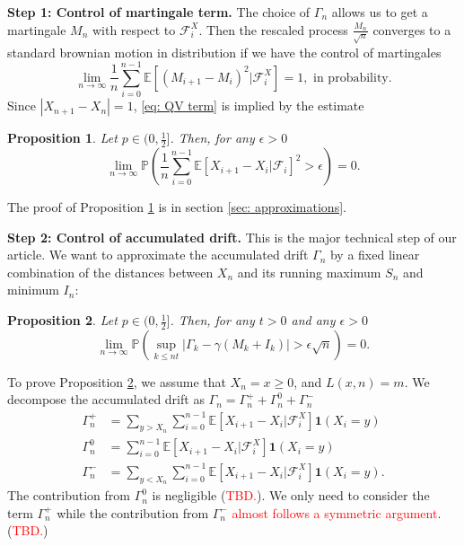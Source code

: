 \documentclass[twoside,12pt,a4paper]{article}
\newtheorem{proposition}{Proposition}[section]
\numberwithin{equation}{section}
\newcommand{\abs}[1]{\left\vert #1 \right\vert}
\newcommand\TBD{\textcolor{red}{TBD.}}
\begin{document}
	\textbf{Step 1: Control of martingale term.}
	The choice of $\Gamma_n$ allows us to get a martingale $M_n$ with respect to $\mathcal{F}_i^X.$ Then the rescaled process $\frac{M_n}{\sqrt{n}}$ converges to a standard brownian motion in distribution if we have the control of martingales 
	\begin{equation}\label{eq: QV term}
		\lim_{n\to \infty}\frac{1}{n} \sum_{i=0}^{n-1}\mathbb{E}\left[ (M_{i+1}- M_{i})^2 |\mathcal{F}_i^X \right] =1,  \mbox{ in probability}.
	\end{equation}
	Since $\abs{X_{n+1}-X_n}=1$,  \eqref{eq: QV term} is implied by the estimate
	\begin{proposition} \label{lm: control of martingale} Let $p\in (0,\frac{1}{2}]$. Then, for any $\epsilon >0$
		\begin{equation}\label{eq:  term}
			\lim_{n \to \infty }\mathbb{P}\left(\frac{1}{n} \sum_{i = 0}^{n-1} \mathbb{E}\left[ X_{i+1} - X_i | \mathcal{F}_i \right]^2 > \epsilon \right) =0. 
		\end{equation}
	\end{proposition}
	The proof of Proposition \ref{lm: control of martingale} is in section \ref{sec: approximations}.
	
	\textbf{Step 2: Control of accumulated drift.} This is the major technical step of our article. We want to approximate the accumulated drift $\Gamma_n$ by a fixed linear combination of the distances between $X_n$ and its running maximum $S_n$ and minimum $I_n$:
	\begin{proposition}\label{lm: control of acc drift}
		Let $p\in (0,\frac{1}{2}]$. Then, for any $t>0$ and any $\epsilon >0$
		\begin{equation}\label{eq: control of acc drift}
			\lim_{n \to \infty }\mathbb{P}\left(\sup_{k\leq nt} \abs{\Gamma_k - \gamma \left(M_k + I_k \right)   } > \epsilon \sqrt{n}  \right) =0. 
		\end{equation}
	\end{proposition}
	To prove Proposition \ref{lm: control of acc drift}, we assume that $X_n=x \geq 0$, and $L(x,n)=m$. We decompose the accumulated drift as $\Gamma_n = 	\Gamma_n^+ +	\Gamma_n^0 + \Gamma_n^-$ 
	\begin{align}
		\Gamma_n^+ &= \sum_{y > X_n} \sum_{i = 0}^{n-1} \mathbb{E}\left[ X_{i + 1} - X_i | \mathcal{F}_i^X \right] \mathbf{1}(X_i = y)\\
		\Gamma_n^0 &= \sum_{i = 0}^{n-1} \mathbb{E}\left[ X_{i + 1} - X_i | \mathcal{F}_i^X \right] \mathbf{1}(X_i = y) \\
		\Gamma_n^- &= \sum_{y < X_n} \sum_{i = 0}^{n-1} \mathbb{E}\left[ X_{i + 1} - X_i | \mathcal{F}_i^X \right] \mathbf{1}(X_i = y)
		.\end{align} 
	The contribution from $\Gamma_n^0$ is negligible (\TBD). We only need to consider the term $\Gamma_n^+$ while the contribution from $\Gamma_n^-$ \textcolor{red}{almost follows a symmetric argument}. (\TBD) 
	
\end{document}
